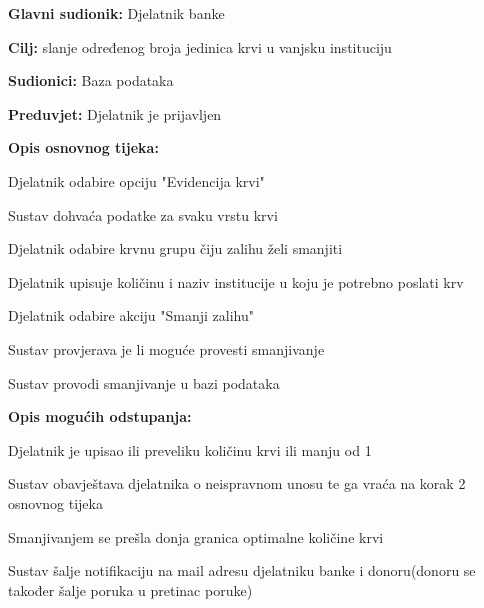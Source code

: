 \noindent {}
					\begin{packed_item}
	
						\item \textbf{Glavni sudionik: }Djelatnik banke
						\item \textbf{Cilj:} slanje određenog broja jedinica krvi u vanjsku instituciju
						\item \textbf{Sudionici:} Baza podataka
						\item \textbf{Preduvjet:} Djelatnik je prijavljen
						\item \textbf{Opis osnovnog tijeka:}
						
						\item[] \begin{packed_enum}
							
							\item Djelatnik odabire opciju "Evidencija krvi"
							\item Sustav dohvaća podatke za svaku vrstu krvi
							\item Djelatnik odabire krvnu grupu čiju zalihu želi smanjiti
							\item Djelatnik upisuje količinu i naziv institucije u koju je potrebno poslati krv
							\item Djelatnik odabire akciju "Smanji zalihu"
							\item Sustav provjerava je li moguće provesti smanjivanje
							\item Sustav provodi smanjivanje u bazi podataka
						\end{packed_enum}
						\item  \textbf{Opis mogućih odstupanja:}
						
						\item[] \begin{packed_item}
							\item[4.a] Djelatnik je upisao ili preveliku količinu krvi ili manju od 1				
							\item[] \begin{packed_enum}
								
								\item  Sustav obavještava djelatnika o neispravnom unosu te ga vraća na korak 2 osnovnog tijeka
									\end{packed_enum}
							\item[5.a] Smanjivanjem se prešla donja granica optimalne količine krvi
							\item[] \begin{packed_enum}
								
								\item  Sustav šalje notifikaciju na mail adresu djelatniku banke i donoru(donoru se također šalje poruka u pretinac poruke)
							 

								
									\end{packed_enum}
								\end{packed_item}			
									
									
									
					\end{packed_item}
				


